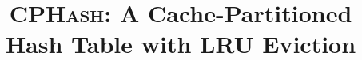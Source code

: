 \documentclass[10pt,twocolumn]{article}
\begin{document}
\newcommand{\cphash}{{\scshape CPHash}}
\newcommand{\cpserver}{{\scshape CPServer}}
\newcommand{\lockhash}{{\scshape LockHash}}
\newcommand{\lockserver}{{\scshape LockServer}}
\newcommand{\memcached}{{\scshape Memcached}}

\title{\cphash: A Cache-Partitioned Hash Table with LRU Eviction}
\author{}
\date{}
\maketitle





%





\end{document}
